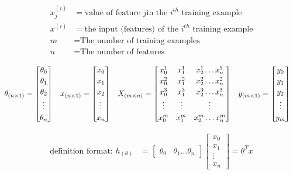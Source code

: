 \begin{align*}
	x_j^{(i)} & = \text{value of feature } j \text{in the } i^{th} \text{ training example} \\
	x^{(i)} & = \text{the input (features) of the } i^{th} \text{ training example} \\
	m & = \text{The number of training examples} \\
	n & = \text{The number of features}
\end{align*}

\begin{align*}
    \theta_{(n \times 1)} & = \begin{bmatrix}
			\theta_0 \\
			\theta_1 \\
			\theta_2 \\
			\vdots \\
			\theta_{n} 
		\end{bmatrix}
	&
	x_{(n \times 1)} & = \begin{bmatrix}
			x_0 \\
			x_1 \\
			x_2 \\
			\vdots \\
			x_n 
		\end{bmatrix}
	&
	X_{(m \times n)} & = \renewcommand\arraystretch{1.2}\begin{bmatrix}
			x_0^1 & x_1^1 & x_2^1 \hdots x_n^1 \\
			x_0^2 & x_1^2 & x_2^2 \hdots x_n^2 \\
			x_0^3 & x_1^3 & x_2^3 \hdots x_n^3 \\
			\vdots & \vdots & \vdots \\
			x_0^m & x_1^m & x_2^m \hdots x_n^m \\
		\end{bmatrix}
	&
	y_{(m \times 1)} & = \begin{bmatrix}
			y_0 \\
			y_1 \\
			y_2 \\
			\vdots \\
			y_m
		\end{bmatrix}
\end{align*}

\begin{align*}
	\text{definition format: } h_{(\theta)} & = 
	\begin{bmatrix} \theta_0 & \theta_1 \hdots \theta_n \end{bmatrix}
	\begin{bmatrix} 
		x_0 \\
		x_1 \\
		\vdots \\
		x_n
	\end{bmatrix} = \theta^Tx
\end{align*}


